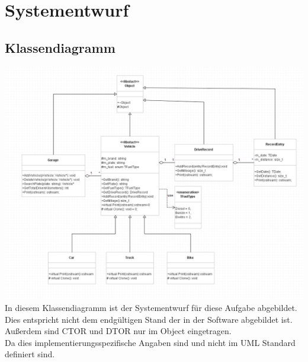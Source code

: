 \documentclass[12pt,naustrian,a4widepaper]{scrartcl}
\begin{document}
\clearpage
\section{Systementwurf}

\subsection{Klassendiagramm}
\includegraphics[width=14cm]{./Images/Klassendiagramm.png}
In diesem Klassendiagramm ist der Systementwurf für diese Aufgabe abgebildet. \\
Dies entspricht nicht dem endgültigen Stand der in der Software abgebildet ist. \\
Außerdem sind CTOR und DTOR nur im Object eingetragen. \\
Da dies implementierungsspezifische Angaben sind und nicht im UML Standard definiert sind. \\
\newpage
\end{document}
